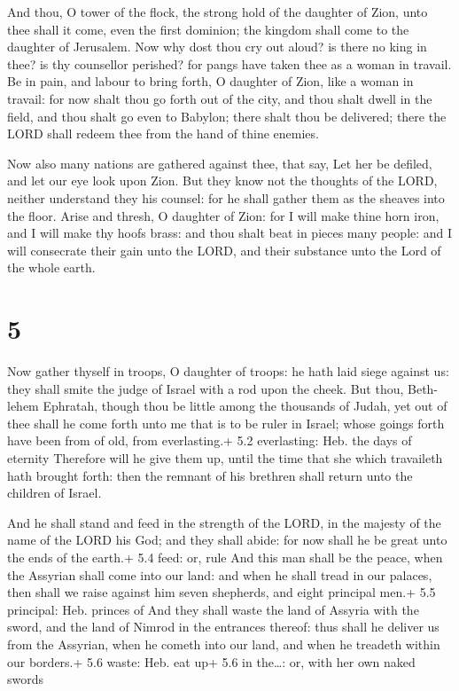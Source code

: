  And thou, O tower of the flock, the strong hold of the
daughter of Zion, unto thee shall it come, even the first dominion; the
kingdom shall come to the daughter of Jerusalem.  Now why
dost thou cry out aloud? is there no king in thee? is thy counsellor
perished? for pangs have taken thee as a woman in travail. 
Be in pain, and labour to bring forth, O daughter of Zion, like a woman
in travail: for now shalt thou go forth out of the city, and thou shalt
dwell in the field, and thou shalt go even to Babylon; there shalt thou
be delivered; there the LORD shall redeem thee from the hand of thine
enemies.

 Now also many nations are gathered against thee, that
say, Let her be defiled, and let our eye look upon Zion. 
But they know not the thoughts of the LORD, neither understand they his
counsel: for he shall gather them as the sheaves into the floor.
 Arise and thresh, O daughter of Zion: for I will make
thine horn iron, and I will make thy hoofs brass: and thou shalt beat in
pieces many people: and I will consecrate their gain unto the LORD, and
their substance unto the Lord of the whole earth.

\hypertarget{section-4}{%
\section{5}\label{section-4}}

 Now gather thyself in troops, O daughter of troops: he hath
laid siege against us: they shall smite the judge of Israel with a rod
upon the cheek.  But thou, Beth-lehem Ephratah, though thou
be little among the thousands of Judah, yet out of thee shall he come
forth unto me that is to be ruler in Israel; whose goings forth have
been from of old, from everlasting.+ 5.2 everlasting: Heb. the days of
eternity  Therefore will he give them up, until the time
that she which travaileth hath brought forth: then the remnant of his
brethren shall return unto the children of Israel.

 And he shall stand and feed in the strength of the LORD,
in the majesty of the name of the LORD his God; and they shall abide:
for now shall he be great unto the ends of the earth.+ 5.4 feed: or,
rule  And this man shall be the peace, when the Assyrian
shall come into our land: and when he shall tread in our palaces, then
shall we raise against him seven shepherds, and eight principal men.+
5.5 principal: Heb. princes of  And they shall waste the
land of Assyria with the sword, and the land of Nimrod in the entrances
thereof: thus shall he deliver us from the Assyrian, when he cometh into
our land, and when he treadeth within our borders.+ 5.6 waste: Heb. eat
up+ 5.6 in the\ldots: or, with her own naked swords

